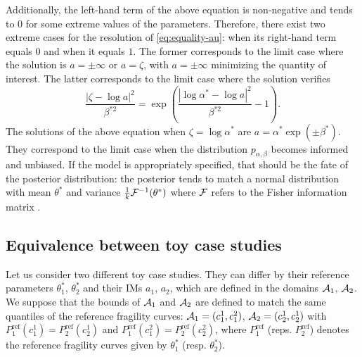         Additionally, the left-hand term of the above equation is non-negative and tends to $0$ for some extreme values of the parameters.
        Therefore, there exist two extreme cases for the resolution of \cref{eq:equality-au}: when its right-hand term equals $0$ and when it equals $1$. The former corresponds to the limit case where the solution is $a=\pm\infty$ or $a=\zeta$, with $a=\pm\infty$ minimizing the quantity of interest. 
        The latter corresponds to the limit case where the solution verifies
            \begin{equation}
                \frac{|\zeta-\log a|^2}{\beta^{\ast2}} = \exp\left( \frac{|\log\alpha^\ast-\log a|^2}{\beta^{\ast2}} -1\right).
            \end{equation}
        The solutions of the above equation when $\zeta =\log\alpha^\ast$ are $a=\alpha^\ast\exp\left(\pm\beta^\ast\right).$
        They correspond to the limit case when the distribution $p_{\alpha,\beta}$ becomes informed and unbiased. 
        If the model is appropriately specified, that should be the fate of the posterior distribution: the posterior tends to match a normal distribution with mean $\theta^\ast$ and variance $\frac{1}{k}\mathcal{F}^{-1}(\theta^\ast)$ where $\mathcal{F}$ refers to the Fisher information matrix \citep{van_der_vaart_asymptotic_1992}.
    
        
    
    
    
    
    \subsection{Equivalence between toy case studies}\label{app:equiv-toy}
    
        Let us consider two different toy case studies. They can differ by their reference parameters $\theta_1^\ast$, $\theta_2^\ast$ and their IMs $a_1$, $a_2$, which are defined in the domains $\mathcal{A}_1$, $\mathcal{A}_2$.
        We suppose that the bounds of $\mathcal{A}_1$ and $\mathcal{A}_2$ are defined to match the same quantiles of the reference fragility curves: $\mathcal{A}_1=(c_1^1,c_1^2)$, $\mathcal{A}_2=(c_2^1,c_2^1)$ with $P^{\mathrm{ref}}_1(c_1^1)=P^{\mathrm{ref}}_2(c_2^1)$ and $P^{\mathrm{ref}}_1(c_1^2)=P^{\mathrm{ref}}_2(c_2^2)$, where $P^{\mathrm{ref}}_1$ (reps. $P^{\mathrm{ref}}_2$) denotes the reference fragility curves given by $\theta_1^\ast$ (resp. $\theta^\ast_2$).
    
